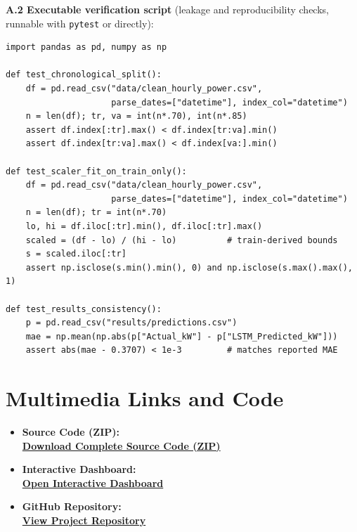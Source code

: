 \documentclass[11pt,a4paper]{article}
\begin{document}
\noindent\textbf{A.2 Executable verification script} (leakage and
reproducibility checks, runnable with \texttt{pytest} or directly):\par
\begin{verbatim}
import pandas as pd, numpy as np

def test_chronological_split():
    df = pd.read_csv("data/clean_hourly_power.csv",
                     parse_dates=["datetime"], index_col="datetime")
    n = len(df); tr, va = int(n*.70), int(n*.85)
    assert df.index[:tr].max() < df.index[tr:va].min()
    assert df.index[tr:va].max() < df.index[va:].min()

def test_scaler_fit_on_train_only():
    df = pd.read_csv("data/clean_hourly_power.csv",
                     parse_dates=["datetime"], index_col="datetime")
    n = len(df); tr = int(n*.70)
    lo, hi = df.iloc[:tr].min(), df.iloc[:tr].max()
    scaled = (df - lo) / (hi - lo)          # train-derived bounds
    s = scaled.iloc[:tr]
    assert np.isclose(s.min().min(), 0) and np.isclose(s.max().max(), 1)

def test_results_consistency():
    p = pd.read_csv("results/predictions.csv")
    mae = np.mean(np.abs(p["Actual_kW"] - p["LSTM_Predicted_kW"]))
    assert abs(mae - 0.3707) < 1e-3         # matches reported MAE
\end{verbatim}

\section{Multimedia Links and Code}

\begin{itemize}

\item \textbf{Source Code (ZIP):}\\[4pt]
\href{https://github.com/S1122A/SmartGrid-Dissertation/raw/refs/heads/main/20068400_Code.zip}
{\large\textbf{Download Complete Source Code (ZIP)}}

\item \textbf{Interactive Dashboard:}\\[4pt]
\href{https://smartgrid-dissertation-esaunxm6rzlswabanum4yj.streamlit.app/}
{\large\textbf{Open Interactive Dashboard}}

\item \textbf{GitHub Repository:}\\[2pt]
\href{https://github.com/S1122A/SmartGrid-Dissertation}
{\large\textbf{View Project Repository}}

\end{itemize}

\clearpage
\nocite{*}


\end{document}
